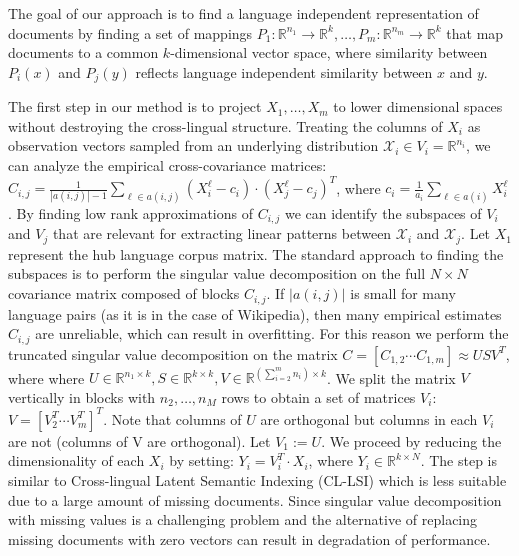 \documentclass{article} %
\newcommand{\RR}{\mathbb{R}}
\begin{document}
The goal of our approach is to find a language independent representation of documents by finding a set of mappings $P_1: \RR^{n_1} \rightarrow \RR^k ,\ldots, P_m: \RR^{n_m} \rightarrow \RR^k$ that map documents to a common $k$-dimensional vector space, where similarity between $P_i(x)$ and $P_j(y)$ reflects language independent similarity between $x$ and $y$.

The first step in our method is to project $X_1, \ldots, X_m$ to lower dimensional spaces without destroying the cross-lingual structure. Treating the columns of $X_i$ as observation vectors sampled from an underlying distribution $\mathcal{X}_i \in V_i = \RR^{n_i}$, we can analyze the empirical cross-covariance matrices: $C_{i,j} = \frac{1}{|a(i,j)|-1 }\sum_{\ell \in a(i,j)} (X_i^{\ell} - c_i)\cdot (X_j^{\ell} - c_j)^T$, where $c_i = \frac{1}{a_i} \sum_{\ell \in a(i)}X_i^{\ell}$. By finding low rank approximations of $C_{i,j}$ we can identify the subspaces of $V_i$ and $V_j$ that are relevant for extracting linear patterns between $\mathcal{X}_i$ and $\mathcal{X}_j$. Let $X_1$ represent the hub language corpus matrix. The standard approach to finding the subspaces is to perform the singular value decomposition on the full $N \times N$ covariance matrix composed of blocks $C_{i,j}$. If $|a(i,j)|$ is small for many language pairs (as it is in the case of Wikipedia), then many empirical estimates $C_{i,j}$ are unreliable, which can result in overfitting. For this reason we perform the truncated singular value decomposition on the matrix $C = [C_{1,2}  \cdots  C_{1,m}] \approx U S V^T$, where where $U \in \RR^{n_1 \times k}, S \in \RR^{k \times k}, V \in \RR^{(\sum_{i=2}^m n_i) \times k}$. We split the matrix $V$ vertically in blocks with $n_2, \ldots, n_M$ rows to obtain a set of matrices $V_i$: $V = [V_2^T  \cdots  V_m^T]^T$. Note that columns of $U$ are orthogonal but columns in each $V_i$ are not (columns of V are orthogonal). Let $V_1 := U$. We proceed by reducing the dimensionality of each $X_i$ by setting: $Y_i = V_i^T \cdot X_i$, where $Y_i \in \RR^{k\times N}$. The step is similar to Cross-lingual Latent Semantic Indexing (CL-LSI) \cite{lsi}\cite{cl_lsi} which is less suitable due to a large amount of missing documents. Since singular value decomposition with missing values is a challenging problem and the alternative of replacing missing documents with zero vectors can result in degradation of performance.
\end{document}
